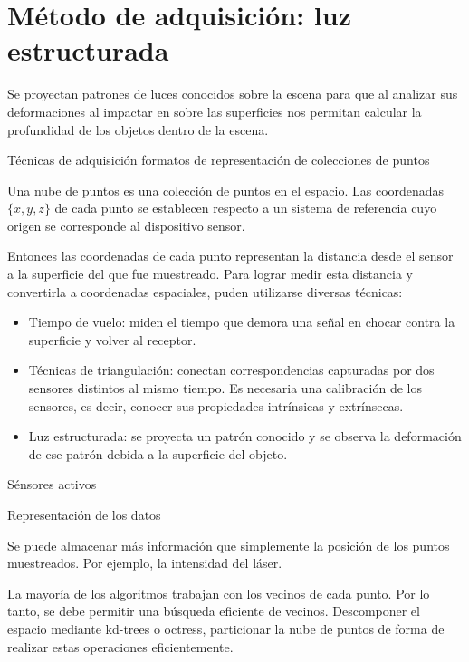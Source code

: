 \section{Método de adquisición: luz estructurada}



Se proyectan patrones de luces conocidos sobre la escena para que al analizar
sus deformaciones al impactar en sobre las superficies nos permitan calcular la
profundidad de los objetos dentro de la escena.


Técnicas de adquisición
formatos de representación de colecciones de puntos


Una nube de puntos es una colección de puntos en el espacio.
Las coordenadas $\{x, y, z\}$ de cada punto se establecen respecto
a un sistema de referencia cuyo origen se corresponde al dispositivo sensor.

Entonces las coordenadas de cada punto representan la distancia
desde el sensor a la superficie del que fue muestreado.
Para lograr medir esta distancia y convertirla a coordenadas espaciales,
puden utilizarse diversas técnicas:
\begin{itemize}
	\item Tiempo de vuelo: miden el tiempo que demora una señal
		en chocar contra la superficie y volver al receptor.
	\item Técnicas de triangulación: conectan correspondencias
		capturadas por dos sensores distintos al mismo tiempo.
		Es necesaria una calibración de los sensores, es decir,
		conocer sus propiedades intrínsicas y extrínsecas.
	\item Luz estructurada: se proyecta un patrón conocido y se observa la
		deformación de ese patrón debida a la superficie del objeto.
\end{itemize}

Sénsores activos


Representación de los datos

Se puede almacenar más información que simplemente la posición de los puntos muestreados.
Por ejemplo, la intensidad del láser.

La mayoría de los algoritmos trabajan con los vecinos de cada punto.
Por lo tanto, se debe permitir una búsqueda eficiente de vecinos.
Descomponer el espacio mediante kd-trees o octress,
particionar la nube de puntos de forma de realizar estas operaciones eficientemente.

